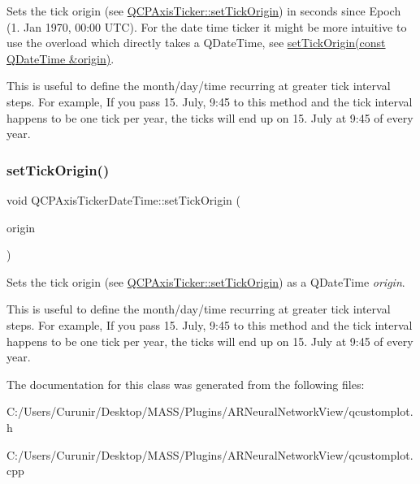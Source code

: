 Sets the tick origin (see \hyperlink{class_q_c_p_axis_ticker_ab509c7e500293bf66a8409f0d7c23943}{Q\+C\+P\+Axis\+Ticker\+::set\+Tick\+Origin}) in seconds since Epoch (1. Jan 1970, 00\+:00 U\+TC). For the date time ticker it might be more intuitive to use the overload which directly takes a Q\+Date\+Time, see \hyperlink{class_q_c_p_axis_ticker_date_time_a2ea905872b8171847a49a5e093fb0c48}{set\+Tick\+Origin(const Q\+Date\+Time \&origin)}.

This is useful to define the month/day/time recurring at greater tick interval steps. For example, If you pass 15. July, 9\+:45 to this method and the tick interval happens to be one tick per year, the ticks will end up on 15. July at 9\+:45 of every year. \mbox{\label{class_q_c_p_axis_ticker_date_time_a2ea905872b8171847a49a5e093fb0c48}} 
\subsubsection{\texorpdfstring{set\+Tick\+Origin()}{setTickOrigin()}\hspace{0.1cm}{\footnotesize\ttfamily [2/2]}}
{\footnotesize\ttfamily void Q\+C\+P\+Axis\+Ticker\+Date\+Time\+::set\+Tick\+Origin (\begin{DoxyParamCaption}\item[{const Q\+Date\+Time \&}]{origin }\end{DoxyParamCaption})}

Sets the tick origin (see \hyperlink{class_q_c_p_axis_ticker_ab509c7e500293bf66a8409f0d7c23943}{Q\+C\+P\+Axis\+Ticker\+::set\+Tick\+Origin}) as a Q\+Date\+Time {\itshape origin}.

This is useful to define the month/day/time recurring at greater tick interval steps. For example, If you pass 15. July, 9\+:45 to this method and the tick interval happens to be one tick per year, the ticks will end up on 15. July at 9\+:45 of every year. 

The documentation for this class was generated from the following files\+:\begin{DoxyCompactItemize}
\item 
C\+:/\+Users/\+Curunir/\+Desktop/\+M\+A\+S\+S/\+Plugins/\+A\+R\+Neural\+Network\+View/qcustomplot.\+h\item 
C\+:/\+Users/\+Curunir/\+Desktop/\+M\+A\+S\+S/\+Plugins/\+A\+R\+Neural\+Network\+View/qcustomplot.\+cpp\end{DoxyCompactItemize}
